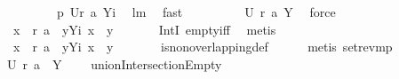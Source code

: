 \begin{isabellebody}
\ \ \ \ \isamarkupfalse%
\ \isamarkupfalse%
\ \isamarkupfalse%
\ {\isachardoublequoteopen}{\isacharquery}p\ {\isacharparenleft}{\isacharquery}U{\isacharbackquote}{\isacharbraceleft}{\isacharparenleft}{\isacharquery}r\ {\isacharquery}a{}{\isacharparenright}{\isacharcomma}\ {\isacharquery}Yi{\isacharbraceright}{\isacharparenright}{\isachardoublequoteclose}\ \isamarkupfalse%
\ lm{}{}\ \isamarkupfalse%
\ fast\isanewline
\ \ \ \ \isamarkupfalse%
\ \isamarkupfalse%
\ {\isachardoublequoteopen}{\isachardot}{\isachardot}{\isachardot}\ {\isacharequal}\ {\isacharbraceleft}{\isacharquery}U\ {\isacharparenleft}{\isacharquery}r\ {\isacharquery}a{}{\isacharparenright}{\isacharcomma}\ {\isacharquery}Y{\isacharbraceright}{\isachardoublequoteclose}\ \isamarkupfalse%
\ force\isanewline
\ \ \ \ \isamarkupfalse%
\ \isamarkupfalse%
\ \isamarkupfalse%
\ {\isachardoublequoteopen}{\isasymforall}\ x\ {\isasymin}\ {\isacharquery}r\ {\isacharquery}a{}{\isachardot}\ {\isasymforall}\ y{\isasymin}{\isacharquery}Yi{\isachardot}\ x\ {\isasymnoteq}\ y{\isachardoublequoteclose}\ \isanewline
\ \ \ \ \isamarkupfalse%
\ IntI\ empty{\isacharunderscore}iff\ \isamarkupfalse%
\ metis\isanewline
\ \ \ \ \isamarkupfalse%
\ \isamarkupfalse%
\ \isamarkupfalse%
\ {\isachardoublequoteopen}{\isasymforall}\ x\ {\isasymin}\ {\isacharquery}r\ {\isacharquery}a{}{\isachardot}\ {\isasymforall}\ y{\isasymin}{\isacharquery}Yi{\isachardot}\ x\ {\isasyminter}\ y\ {\isacharequal}\ {\isacharbraceleft}{\isacharbraceright}{\isachardoublequoteclose}\ \isamarkupfalse%
\ {}\ {}\ {}\ is{\isacharunderscore}non{\isacharunderscore}overlapping{\isacharunderscore}def\isanewline
\ \ \ \ \isamarkupfalse%
\ {\isacharparenleft}metis\ set{\isacharunderscore}rev{\isacharunderscore}mp{\isacharparenright}\isanewline
\ \ \ \ \isamarkupfalse%
\ \isamarkupfalse%
\ {\isachardoublequoteopen}{\isacharquery}U\ {\isacharparenleft}{\isacharquery}r\ {\isacharquery}a{}{\isacharparenright}\ {\isasyminter}\ {\isacharquery}Y\ {\isacharequal}\ {\isacharbraceleft}{\isacharbraceright}{\isachardoublequoteclose}\ \isamarkupfalse%
\ unionIntersectionEmpty\isanewline

\end{isabellebody}
